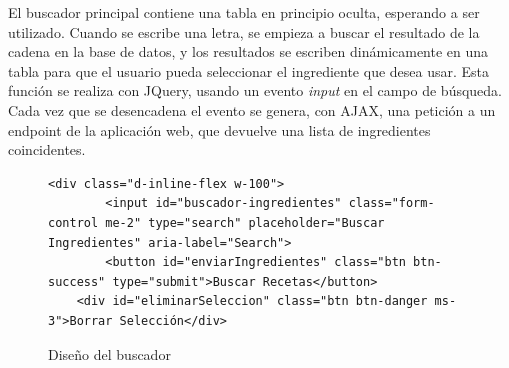 El buscador principal contiene una tabla en principio oculta, esperando a ser utilizado. Cuando se escribe una letra, se empieza a buscar el resultado de la cadena en la base de datos, y los resultados se escriben dinámicamente en una tabla para que el usuario pueda seleccionar el ingrediente que desea usar. Esta función se realiza con \gls{JQuery}, usando un evento \textit{input} en el campo de búsqueda. Cada vez que se desencadena el evento se genera, con \gls{AJAX}, una petición a un \gls{endpoint} de la aplicación web, que devuelve una lista de ingredientes coincidentes.
\begin{figure}[h!]
\centering
{}
\label{fig:buscador}
\begin{lstlisting}[style=consola]
    <div class="d-inline-flex w-100">
        <input id="buscador-ingredientes" class="form-control me-2" type="search" placeholder="Buscar Ingredientes" aria-label="Search">
        <button id="enviarIngredientes" class="btn btn-success" type="submit">Buscar Recetas</button>
    <div id="eliminarSeleccion" class="btn btn-danger ms-3">Borrar Selección</div>
\end{lstlisting}
\caption{Diseño del buscador}
\end{figure}

